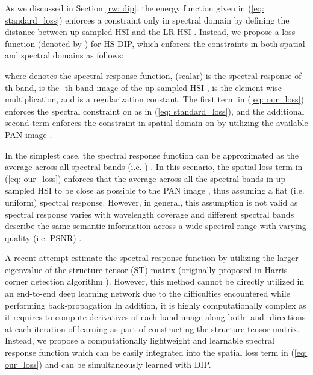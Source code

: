 \documentclass[journal]{IEEEtran}
\begin{document}
    As we discussed in Section \ref{rw: dip}, the energy function given in (\ref{eq: standard_loss}) enforces a constraint only in spectral domain by defining the  distance between up-sampled HSI  and the LR HSI . Instead, we propose a loss function (denoted by ) for HS DIP, which enforces the constraints in both spatial and spectral domains as follows:
    
    where  denotes the spectral response function,   (scalar) is the spectral response of -th band,  is  the -th band image of the up-sampled HSI ,  is the element-wise multiplication, and  is a regularization constant. The first term in (\ref{eq: our_loss}) enforces the spectral constraint on  as in (\ref{eq: standard_loss}), and the additional second term enforces the constraint in spatial domain on  by utilizing the available PAN image . 
    \par In the simplest case, the spectral response function can be approximated as the average across all spectral bands (i.e. ) \cite{SpectralRes1, SpectralRes2}. In this scenario, the spatial loss term in (\ref{eq: our_loss}) enforces that the average across all the spectral bands in up-sampled HSI  to be close as possible to the PAN image , thus assuming a flat (i.e. uniform) spectral response. However, in general, this assumption is not valid as spectral response varies with wavelength coverage and different spectral bands describe the same semantic information across a wide spectral range with varying quality (i.e. PSNR) \cite{SpectralResEigen}. 
    
    \par A recent attempt \cite{SpectralResEigen} estimate the spectral response function  by utilizing the larger eigenvalue of the structure tensor (ST) matrix  (originally proposed in Harris corner detection algorithm  \cite{harris1988combined}). However, this method cannot be directly utilized in an end-to-end deep learning network due to the difficulties encountered while performing  back-propagation  In addition, it is highly computationally complex as it requires to compute derivatives of each band image along both -and -directions at each iteration of learning as part of constructing the structure tensor matrix. Instead, we propose a computationally lightweight and learnable spectral response function which can be easily integrated into the spatial loss term in (\ref{eq: our_loss}) and can be simultaneously learned with DIP.
    
\end{document}
